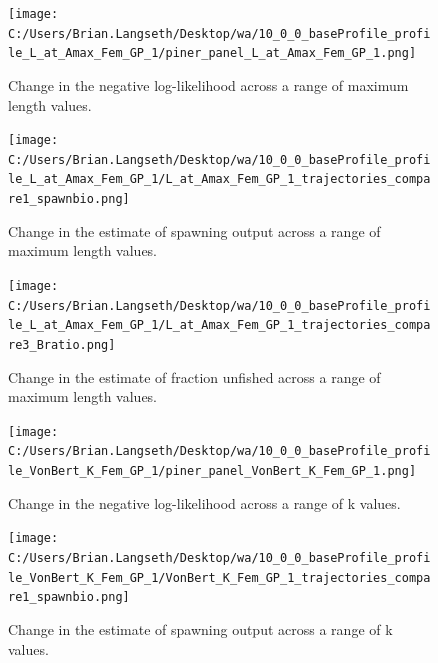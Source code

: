 \documentclass[11pt,
  english,
  letterpaper,
]{article}
\begin{document}
\begin{figure}
\centering
\texttt{[image: C:/Users/Brian.Langseth/Desktop/wa/10\_0\_0\_baseProfile\_profile\_L\_at\_Amax\_Fem\_GP\_1/piner\_panel\_L\_at\_Amax\_Fem\_GP\_1.png]}
\caption{Change in the negative log-likelihood across a range of maximum length values.\label{fig:linf-profile}}
\end{figure}

\tagmcend\tagstructend


\begin{figure}
\centering
\texttt{[image: C:/Users/Brian.Langseth/Desktop/wa/10\_0\_0\_baseProfile\_profile\_L\_at\_Amax\_Fem\_GP\_1/L\_at\_Amax\_Fem\_GP\_1\_trajectories\_compare1\_spawnbio.png]}
\caption{Change in the estimate of spawning output across a range of maximum length values.\label{fig:linf-ssb}}
\end{figure}

\tagmcend\tagstructend


\begin{figure}
\centering
\texttt{[image: C:/Users/Brian.Langseth/Desktop/wa/10\_0\_0\_baseProfile\_profile\_L\_at\_Amax\_Fem\_GP\_1/L\_at\_Amax\_Fem\_GP\_1\_trajectories\_compare3\_Bratio.png]}
\caption{Change in the estimate of fraction unfished across a range of maximum length values.\label{fig:linf-depl}}
\end{figure}

\tagmcend\tagstructend


\begin{figure}
\centering
\texttt{[image: C:/Users/Brian.Langseth/Desktop/wa/10\_0\_0\_baseProfile\_profile\_VonBert\_K\_Fem\_GP\_1/piner\_panel\_VonBert\_K\_Fem\_GP\_1.png]}
\caption{Change in the negative log-likelihood across a range of k values.\label{fig:k-profile}}
\end{figure}

\tagmcend\tagstructend


\begin{figure}
\centering
\texttt{[image: C:/Users/Brian.Langseth/Desktop/wa/10\_0\_0\_baseProfile\_profile\_VonBert\_K\_Fem\_GP\_1/VonBert\_K\_Fem\_GP\_1\_trajectories\_compare1\_spawnbio.png]}
\caption{Change in the estimate of spawning output across a range of k values.\label{fig:k-ssb}}
\end{figure}
\end{document}
